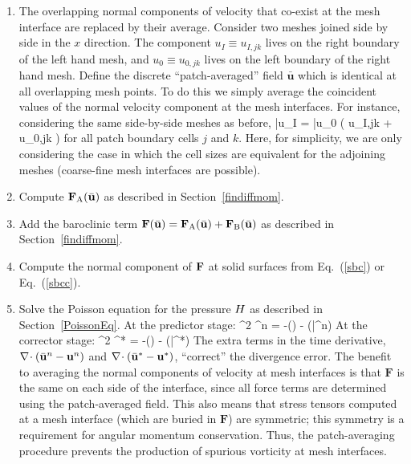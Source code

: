 \begin{enumerate}
\item The overlapping normal components of velocity that co-exist at the mesh interface are replaced by their average. Consider two meshes joined side by side in the $x$ direction. The component $u_I \equiv u_{I,jk}$ lives on the right boundary of the left hand mesh, and $u_0 \equiv u_{0,jk}$ lives on the left boundary of the right hand mesh. Define the discrete ``patch-averaged'' field $\bar{\mathbf{u}}$ which is identical at all overlapping mesh points. To do this we simply average the coincident values of the normal velocity component at the mesh interfaces. For instance, considering the same side-by-side meshes as before,
   \be
   \label{eqn_patchave_ufield}
      \bar{u}_I = \bar{u}_0 \equiv {} \left( u_{I,jk} + u_{0,jk} \right)
   \ee
   for all patch boundary cells $j$ and $k$. Here, for simplicity, we are only considering the case in which the cell sizes are equivalent for the adjoining meshes (coarse-fine mesh interfaces are possible).
\item Compute ${\mathbf{F}}_{\rm A}(\bar{\mathbf{u}})$ as described in Section~\ref{findiffmom}.

\item\label{step3} Add the baroclinic term ${\mathbf{F}}(\bar{\mathbf{u}})={\mathbf{F}}_{\rm A}(\bar{\mathbf{u}})+{\mathbf{F}}_{\rm B}(\bar{\mathbf{u}})$ as described in Section~\ref{findiffmom}.

\item Compute the normal component of ${\mathbf{F}}$ at solid surfaces from Eq.~(\ref{sbc}) or Eq.~(\ref{sbcc}).

\item Solve the Poisson equation for the pressure $H$ as described in Section~\ref{PoissonEq}. At the predictor stage:
\be
\label{eqn_poisson_stg1}
\nabla^2 {\cH}^n = -\left(\right) - (\bar{}^n)
\ee
At the corrector stage:
\be
\label{eqn_poisson_stg2}
\nabla^2 {\cH}^* = -\left(\right) - (\bar{}^*)
\ee
The extra terms in the time derivative, $\nabla\!\cdot (\bar{{\mathbf{u}}}^n - {\mathbf{u}}^n)$ and $\nabla\!\cdot (\bar{{\mathbf{u}}}^* - {\mathbf{u}}^*)$, ``correct'' the divergence error. The benefit to averaging the normal components of velocity at mesh interfaces is that $\mathbf{F}$ is the same on each side of the interface, since all force terms are determined using the patch-averaged field. This also means that stress tensors computed at a mesh interface (which are buried in $\mathbf{F}$) are symmetric; this symmetry is a requirement for angular momentum conservation.  Thus, the patch-averaging procedure prevents the production of spurious vorticity at mesh interfaces.


\end{enumerate}
